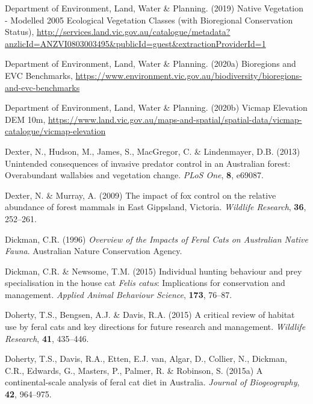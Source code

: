 \documentclass[11pt,a4paper,titlepage,twoside,openright]{style/unimelbthesis}
\begin{document}
\begin{mainmatter}
\leavevmode\hypertarget{ref-NV2005_EVCBCS}{}%
Department of Environment, Land, Water \& Planning. (2019) Native Vegetation - Modelled 2005 Ecological Vegetation Classes (with Bioregional Conservation Status), \url{http://services.land.vic.gov.au/catalogue/metadata?anzlicId=ANZVI0803003495\&publicId=guest\&extractionProviderId=1}

\leavevmode\hypertarget{ref-delwp2020bioregions}{}%
Department of Environment, Land, Water \& Planning. (2020a) Bioregions and EVC Benchmarks, \url{https://www.environment.vic.gov.au/biodiversity/bioregions-and-evc-benchmarks}

\leavevmode\hypertarget{ref-delwp2020elevation}{}%
Department of Environment, Land, Water \& Planning. (2020b) Vicmap Elevation DEM 10m, \url{https://www.land.vic.gov.au/maps-and-spatial/spatial-data/vicmap-catalogue/vicmap-elevation}

\leavevmode\hypertarget{ref-dexter2013unintended}{}%
Dexter, N., Hudson, M., James, S., MacGregor, C. \& Lindenmayer, D.B. (2013) Unintended consequences of invasive predator control in an Australian forest: Overabundant wallabies and vegetation change. \emph{PLoS One}, \textbf{8}, e69087.

\leavevmode\hypertarget{ref-dexter2009impact}{}%
Dexter, N. \& Murray, A. (2009) The impact of fox control on the relative abundance of forest mammals in East Gippsland, Victoria. \emph{Wildlife Research}, \textbf{36}, 252--261.

\leavevmode\hypertarget{ref-dickman1996overview}{}%
Dickman, C.R. (1996) \emph{Overview of the Impacts of Feral Cats on Australian Native Fauna}. Australian Nature Conservation Agency.

\leavevmode\hypertarget{ref-dickman2015individual}{}%
Dickman, C.R. \& Newsome, T.M. (2015) Individual hunting behaviour and prey specialisation in the house cat \emph{Felis catus}: Implications for conservation and management. \emph{Applied Animal Behaviour Science}, \textbf{173}, 76--87.

\leavevmode\hypertarget{ref-doherty2015critical}{}%
Doherty, T.S., Bengsen, A.J. \& Davis, R.A. (2015) A critical review of habitat use by feral cats and key directions for future research and management. \emph{Wildlife Research}, \textbf{41}, 435--446.

\leavevmode\hypertarget{ref-doherty2015continental}{}%
Doherty, T.S., Davis, R.A., Etten, E.J. van, Algar, D., Collier, N., Dickman, C.R., Edwards, G., Masters, P., Palmer, R. \& Robinson, S. (2015a) A continental-scale analysis of feral cat diet in Australia. \emph{Journal of Biogeography}, \textbf{42}, 964--975.


\end{mainmatter}
\end{document}
